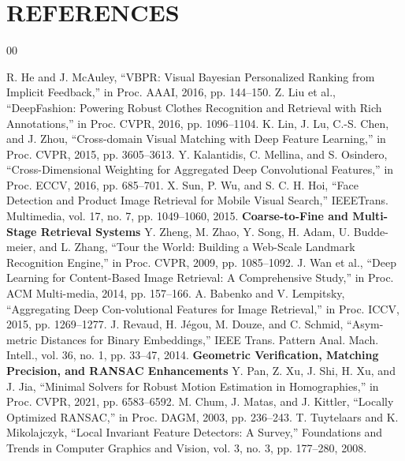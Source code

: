\documentclass[conference]{IEEEtran}
\begin{document}
\section*{REFERENCES}
\begin{thebibliography}{00}

 R. He and J. McAuley, “VBPR: Visual Bayesian Personalized Ranking from Implicit Feedback,” in Proc. AAAI, 2016, pp. 144–150.
 Z. Liu et al., “DeepFashion: Powering Robust Clothes Recognition and Retrieval with Rich Annotations,” in Proc. CVPR, 2016, pp. 1096–1104.
 K. Lin, J. Lu, C.-S. Chen, and J. Zhou, “Cross-domain Visual Matching with Deep Feature Learning,” in Proc. CVPR, 2015, pp. 3605–3613.
 Y. Kalantidis, C. Mellina, and S. Osindero, “Cross-Dimensional Weighting for Aggregated Deep Convolutional Features,” in Proc. ECCV, 2016, pp. 685–701.
 X. Sun, P. Wu, and S. C. H. Hoi, “Face Detection and Product Image Retrieval for Mobile Visual Search,” IEEETrans. Multimedia, vol. 17, no. 7, pp. 1049–1060, 2015.
\textbf{Coarse-to-Fine and Multi-Stage Retrieval Systems} %
 Y. Zheng, M. Zhao, Y. Song, H. Adam, U. Budde-meier, and L. Zhang, “Tour the World: Building a Web-Scale Landmark Recognition Engine,” in Proc. CVPR, 2009, pp. 1085–1092.
 J. Wan et al., “Deep Learning for Content-Based Image Retrieval: A Comprehensive Study,” in Proc. ACM Multi-media, 2014, pp. 157–166.
 A. Babenko and V. Lempitsky, “Aggregating Deep Con-volutional Features for Image Retrieval,” in Proc. ICCV, 2015, pp. 1269–1277.
 J. Revaud, H. Jégou, M. Douze, and C. Schmid, “Asym-metric Distances for Binary Embeddings,” IEEE Trans. Pattern Anal. Mach. Intell., vol. 36, no. 1, pp. 33–47, 2014.
\textbf{Geometric Verification, Matching Precision, and RANSAC Enhancements}
 Y. Pan, Z. Xu, J. Shi, H. Xu, and J. Jia, “Minimal Solvers for Robust Motion Estimation in Homographies,” in Proc. CVPR, 2021, pp. 6583–6592.
 M. Chum, J. Matas, and J. Kittler, “Locally Optimized RANSAC,” in Proc. DAGM, 2003, pp. 236–243.
 T. Tuytelaars and K. Mikolajczyk, “Local Invariant Feature Detectors: A Survey,” Foundations and Trends in Computer Graphics and Vision, vol. 3, no. 3, pp. 177–280, 2008.

\end{thebibliography}
\end{document}
